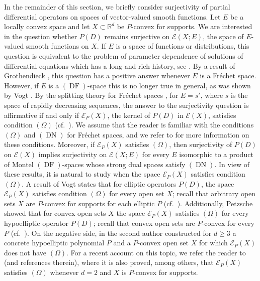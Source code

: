 \documentclass[a4paper,10pt]{amsart}
\newtheorem*{crucial lemma}{Lemma \ref{lem:nice polynomial2}}
\theoremstyle{definition}
\newcommand{\R}{\mathbb{R}}
\begin{document}
In the remainder of this section, we briefly consider surjectivity of partial differential operators on spaces of vector-valued smooth functions. Let $E$ be a locally convex space and let $X\subset\R^d$ be $P$-convex for supports. We are interested in the question whether $P(D)$ remains surjective on $\mathscr{E}(X;E)$, the space of $E$-valued smooth functions on $X$. If $E$ is a space of functions or distributions, this question is equivalent to the problem of parameter dependence of solutions of differential equations which has a long and rich history, see \cite{BonetDomanski06,BonetDomanski08,Domanski10,Mantlik1990,Mantlik1991,Treves1962a,Treves1962b}. By a result of Grothendieck \cite{Grothendieck1955}, this question has a positive answer whenever $E$ is a Fr\'echet space. However, if $E$ is a $(\operatorname{DF})$-space this is no longer true in general, as was shown by Vogt \cite{Vogt1983}. By the splitting theory for Fr\'echet spaces \cite{Vogt1987}, for $E=s'$, where $s$ is the space of rapidly decreasing sequences, the answer to the surjectivity question  is affirmative if and only if $\mathscr{E}_P(X)$, the kernel of $P(D)$ in $\mathscr{E}(X)$, satisfies condition $(\Omega)$ (cf.~\cite{Vogt1983}). We assume that the reader is familiar with the conditions $(\Omega)$ and $(\operatorname{DN})$ for Fr\'echet spaces, and we refer to \cite{MeV} for more information on these conditions. Moreover, if $\mathscr{E}_P(X)$ satisfies $(\Omega)$, then surjectivity of $P(D)$ on $\mathscr{E}(X)$ implies surjectivity on $\mathscr{E}(X;E)$ for every $E$ isomorphic to a product of Montel $(\operatorname{DF})$-spaces whose strong dual spaces satisfy $(\operatorname{DN})$. In view of these results, it is natural to study when the space $\mathscr{E}_P(X)$ satisfies condition $(\Omega)$. A result of Vogt \cite{Vogt1983} states that for elliptic operators $P(D)$, the space $\mathscr{E}_P(X)$ satisfies condition $(\Omega)$ for every open set $X$; recall that arbitrary open sets $X$ are $P$-convex for supports for each elliptic $P$ (cf.~\cite[Corollary 10.8.2]{Hor2}). Additionally, Petzsche \cite{Petzsche1980} showed that for convex open sets $X$ the space $\mathscr{E}_P(X)$ satisfies $(\Omega)$ for every hypoelliptic operator $P(D)$; recall that convex open sets are $P$-convex for every $P$ (cf.~\cite[Theorem 10.6.2]{Hor2}). On the negative side, in \cite{Kalmes12} the second author constructed for $d\geq 3$ a concrete hypoelliptic polynomial $P$ and a $P$-convex open set $X$ for which $\mathscr{E}_P(X)$ does not have $(\Omega)$. For a recent account on this topic, we refer the reader to \cite{DebKalmes2023b} (and references therein), where it is also proved, among others, that $\mathscr{E}_P(X)$ satisfies $(\Omega)$ whenever $d=2$ and $X$ is $P$-convex for supports.
\end{document}
